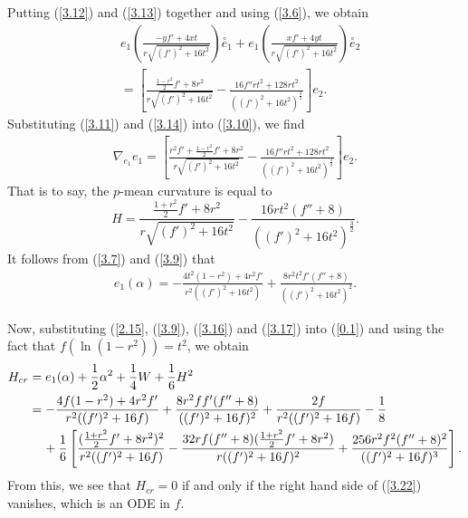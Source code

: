 \documentclass{amsart}
\theoremstyle{Corollary}
\numberwithin{equation}{section}
\begin{document}
Putting (\ref{3.12}) and (\ref{3.13}) together and using (\ref{3.6}), we obtain 
\begin{equation}\label{3.14}
\begin{split}
&e_1\left(\frac{-yf'+4xt}{r\sqrt{(f')^2+16t^2}}\right)\overset{\circ}{e}_1
+e_1\left(\frac{xf'+4yt}
{r\sqrt{(f')^2+16t^2}}\right)\overset{\circ}{e}_2\\
&=\left[\frac{\frac{1-r^2}{2}f'+8r^2}{r\sqrt{(f')^2+16t^2}}-\frac{16f''rt^2+128rt^2}{ ((f')^2+16t^2)^{\frac{3}{2}}}\right]e_2. 
\end{split}
\end{equation}
Substituting (\ref{3.11}) and (\ref{3.14}) into (\ref{3.10}), we find 
\begin{equation*}
\begin{split}
\nabla_{e_1}e_1
=\left[\frac{r^2f'+\frac{1-r^2}{2}f'+8r^2}{r\sqrt{(f')^2+16t^2}}-\frac{16f''rt^2+128rt^2}{ ((f')^2+16t^2)^{\frac{3}{2}}}\right]e_2. 
\end{split}
\end{equation*}
That is to say, the $p$-mean curvature is equal to 
\begin{equation}\label{3.16}
H=\frac{\frac{1+r^2}{2}f'+8r^2}{r\sqrt{(f')^2+16t^2}}-\frac{16rt^2(f'' +8)}{ ((f')^2+16t^2)^{\frac{3}{2}}}.
\end{equation}
It follows from (\ref{3.7}) and (\ref{3.9})
that 
\begin{equation}\label{3.17}
\begin{split}
e_1(\alpha)
=-\frac{4t^2(1-r^2)+4r^2f'}{r^2((f')^2+16t^2)}
+\frac{8r^2t^2f'(f''+8)}{((f')^2+16t^2)^2}.
\end{split}
\end{equation}

Now, substituting 
(\ref{2.15}, (\ref{3.9}), 
(\ref{3.16}) and (\ref{3.17})
into (\ref{0.1})
and using the fact that $f(\ln(1-r^2))=t^2$, we obtain 
\begin{equation}\label{3.22}
\begin{split}
H_{cr}&=e_1(\alpha)+\frac{1}{2}\alpha^2+\frac{1}{4}W+\frac{1}{6}H^2\\
&=-\frac{4f(1-r^2)+4r^2f'}{r^2((f')^2+16f)}
+\frac{8r^2ff'(f''+8)}{((f')^2+16f)^2}+ \frac{2f}{r^2((f')^2+16f)}-\frac{1}{8} \\
&\hspace{4mm}+\frac{1}{6}\left[\frac{(\frac{1+r^2}{2}f'+8r^2)^2}{r^2((f')^2+16f)}
-\frac{32rf(f'' +8)(\frac{1+r^2}{2}f'+8r^2)}{r((f')^2+16f)^{2}}+\frac{256r^2f^2(f'' +8)^2}{ ((f')^2+16f)^{3}}\right]. 
\end{split}
\end{equation}
From this, we see that $H_{cr}=0$ if and only if 
the right hand side of (\ref{3.22}) vanishes, 
which is an ODE in $f$. 
\end{document}
